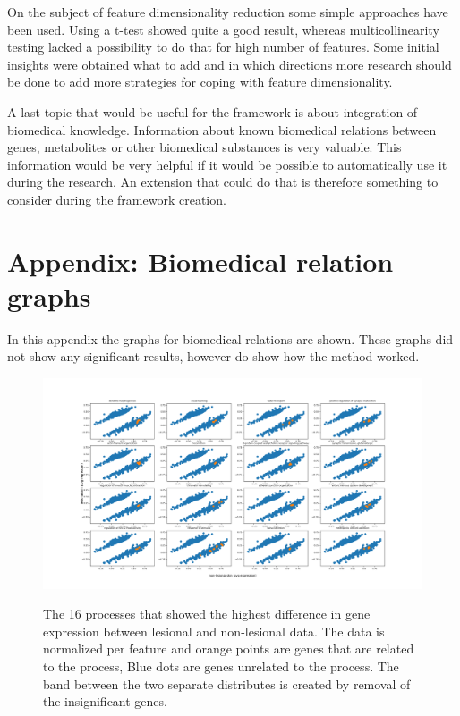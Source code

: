 \documentclass[10pt,a4paper]{report}
\begin{document}
	On the subject of feature dimensionality reduction some simple approaches have been used. Using a t-test showed quite a good result, whereas multicollinearity testing lacked a possibility to do that for high number of features. Some initial insights were obtained what to add and in which directions more research should be done to add more strategies for coping with feature dimensionality.
	
	A last topic that would be useful for the framework is about integration of biomedical knowledge. Information about known biomedical relations between genes, metabolites or other biomedical substances is very valuable. This information would be very helpful if it would be possible to automatically use it during the research. An extension that could do that is therefore something to consider during the framework creation. 
	
	\section{Appendix: Biomedical relation graphs}
	\label{app:BiomedicalClusters}
	
	In this appendix the graphs for biomedical relations are shown. These graphs did not show any significant results, however do show how the method worked.
	
	\begin{figure}[H]
		\includegraphics[width=1\textwidth]{Sign_Processes_Psoriasis_Scaled.png}
		\label{fig:ProcessesScaledByFeature}
		\caption{The 16 processes that showed the highest difference in gene expression between lesional and non-lesional data. The data is normalized per feature and orange points are genes that are related to the process, Blue dots are genes unrelated to the process. The band between the two separate distributes is created by removal of the insignificant genes.}
	\end{figure}
	
\end{document}
